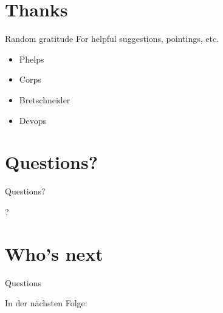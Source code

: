 \documentclass[xcolor=svgnames]{beamer}
\begin{document}
\section{Thanks}

    \begin{frame}{Random gratitude}
        \vspace{0.05\textheight}
        For helpful suggestions, pointings, etc.
        \begin{itemize}
            \item Phelps
            \item Corps
            \item Bretschneider
            \item Devops
        \end{itemize}
    \end{frame}

\section{Questions?}

\begin{frame}{Questions?}
        \begin{center}
            \Huge{?}
        \end{center}
    \end{frame}

\section{Who's next}

    \begin{frame}{Questions}
        \begin{center}
            \Huge{In der nächsten Folge:}\\
        \end{center}
    \end{frame}
\end{document}
